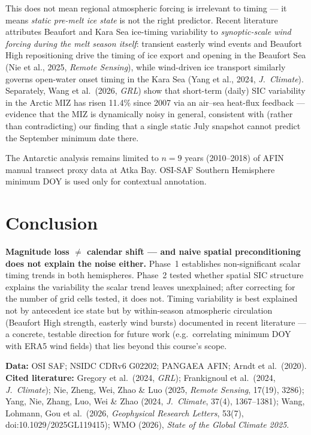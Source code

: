 \documentclass[11pt,a4paper]{article}
\begin{document}
This does not mean regional atmospheric forcing is irrelevant to timing --- it means \emph{static pre-melt ice state} is not the right predictor. Recent literature attributes Beaufort and Kara Sea ice-timing variability to \emph{synoptic-scale wind forcing during the melt season itself}: transient easterly wind events and Beaufort High repositioning drive the timing of ice export and opening in the Beaufort Sea (Nie et al., 2025, \textit{Remote Sensing}), while wind-driven ice transport similarly governs open-water onset timing in the Kara Sea (Yang et al., 2024, \textit{J.~Climate}). Separately, Wang et al.\ (2026, \textit{GRL}) show that short-term (daily) SIC variability in the Arctic MIZ has risen 11.4\% since 2007 via an air--sea heat-flux feedback --- evidence that the MIZ is dynamically noisy in general, consistent with (rather than contradicting) our finding that a single static July snapshot cannot predict the September minimum date there.

The Antarctic analysis remains limited to $n=9$ years (2010--2018) of AFIN manual transect proxy data at Atka Bay. OSI-SAF Southern Hemisphere minimum DOY is used only for contextual annotation.

\section{Conclusion}
\textbf{Magnitude loss $\neq$ calendar shift --- and naive spatial preconditioning does not explain the noise either.} Phase~1 establishes non-significant scalar timing trends in both hemispheres. Phase~2 tested whether spatial SIC structure explains the variability the scalar trend leaves unexplained; after correcting for the number of grid cells tested, it does not. Timing variability is best explained not by antecedent ice state but by within-season atmospheric circulation (Beaufort High strength, easterly wind bursts) documented in recent literature --- a concrete, testable direction for future work (e.g.\ correlating minimum DOY with ERA5 wind fields) that lies beyond this course's scope.

\small
\textbf{Data:} OSI SAF; NSIDC CDRv6 G02202; PANGAEA AFIN; Arndt et al.\ (2020).\\
\textbf{Cited literature:} Gregory et al.\ (2024, \textit{GRL}); Frankignoul et al.\ (2024, \textit{J.~Climate}); Nie, Zheng, Wei, Zhao \& Luo (2025, \textit{Remote Sensing}, 17(19), 3286); Yang, Nie, Zhang, Luo, Wei \& Zhao (2024, \textit{J.~Climate}, 37(4), 1367--1381); Wang, Lohmann, Gou et al.\ (2026, \textit{Geophysical Research Letters}, 53(7), doi:10.1029/2025GL119415); WMO (2026), \textit{State of the Global Climate 2025}.
\end{document}
